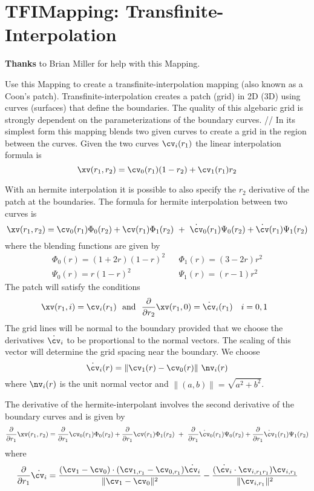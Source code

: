 \section{TFIMapping: Transfinite-Interpolation}

{\bf Thanks} to Brian Miller for help with this Mapping.

Use this Mapping to create a transfinite-interpolation mapping (also known as a Coon's patch).
Transfinite-interpolation creates a patch (grid) in 2D (3D) using curves (surfaces) that define the boundaries.
The quality of this algebaric grid is strongly dependent on the parameterizations
of the boundary curves.
//
In its simplest form this mapping blends two given curves to create a grid
in the region between the curves. 
Given the two curves $\cv_i(r_1)$ the linear interpolation formula is
\[
  \xv(r_1,r_2) = \cv_0(r_1) (1-r_2) + \cv_1(r_1) r_2
\]
   
With an hermite interpolation it is possible to also specify the $r_2$ derivative of the
patch at the boundaries. The formula for hermite interpolation between two curves
is
\[
  \xv(r_1,r_2) = \cv_0(r_1)\Phi_0(r_2) + \cv(r_1) \Phi_1(r_2)
            ~+~  \dot{\cv}_0(r_1)\Psi_0(r_2) + \dot{\cv}(r_1) \Psi_1(r_2)
\]
where the blending functions are given by
\begin{eqnarray*} 
  \Phi_0(r)=(1+2r)(1-r)^2 && \Phi_1(r)=(3-2r) r^2 \\
  \Psi_0(r)= r    (1-r)^2 && \Psi_1(r)=(r-1)  r^2
\end{eqnarray*} 
The patch will satisfy the conditions
\[
 \xv(r_1,i) =  \cv_i(r_1) ~~\mbox{and}~~ {\partial \over\partial r_2} \xv(r_1,0) =  \dot{\cv}_i(r_1)~~~i=0,1 ~~
\]
The grid lines will be normal to the boundary provided that we choose the derivatives $\dot{\cv}_i$
to be proportional to the normal vectors. The scaling of this vector will determine the grid
spacing near the boundary. We choose 
\[
    \dot{\cv}_i(r) = \| \cv_1(r)-\cv_0(r) \| ~\nv_i(r)
\]
 where $\nv_i(r)$ is the unit normal vector and $\| (a,b) \| =\sqrt{a^2+b^2}$. 

 The derivative of the hermite-interpolant involves the second derivative of the
 boundary curves and is given by
\[
  { \partial\over \partial r_1 } \xv(r_1,r_2) = { \partial\over \partial r_1 }\cv_0(r_1)\Phi_0(r_2) 
        +{ \partial\over \partial r_1 } \cv(r_1) \Phi_1(r_2)
    ~+~ { \partial\over \partial r_1 } \dot{\cv}_0(r_1)\Psi_0(r_2) 
      + { \partial\over \partial r_1 } \dot{\cv}_1(r_1) \Psi_1(r_2)
\]
where
\[
  { \partial\over \partial r_1 }  \dot{\cv_i} =   
      { (\cv_1-\cv_0)\cdot(\cv_{1,r_1}-\cv_{0,r_1}) \dot{\cv_i} \over \| \cv_1-\cv_0 \|^2 }
    - { (\dot{\cv_i}\cdot\cv_{i,r_1 r_1}) \cv_{i,r_1} \over \| \cv_{i,r_1} \|^2 }    
\]

